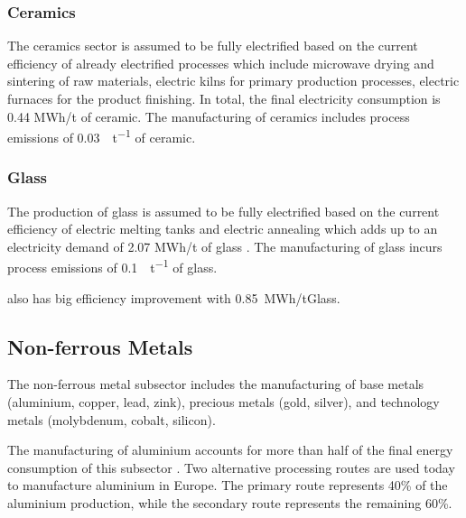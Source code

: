 

\subsubsection{Ceramics}

The ceramics sector is assumed to be fully electrified based on the current
efficiency of already electrified processes which include microwave drying and
sintering of raw materials, electric kilns for primary production processes,
electric furnaces for the product finishing. In total, the final electricity
consumption is 0.44 MWh/t of ceramic. The manufacturing of ceramics includes
process emissions of \SI{0.03}{\tco\per\tonne} of ceramic.


\subsubsection{Glass}

The production of glass is assumed to be fully electrified based on the current
efficiency of electric melting tanks and electric annealing which adds up to an
electricity demand of 2.07 MWh/t of glass
. The manufacturing of glass incurs
process emissions of \SI{0.1}{\tco\per\tonne} of glass.


 also has big efficiency improvement with 0.85~MWh\el/tGlass.

\subsection{Non-ferrous Metals}
\label{sec:si:industry:nfm}

The non-ferrous metal subsector includes the manufacturing of base metals
(aluminium, copper, lead, zink), precious metals (gold, silver), and technology
metals (molybdenum, cobalt, silicon).

The manufacturing of aluminium accounts for more than half of the final energy
consumption of this subsector \citeS{}. Two alternative processing routes are
used today to manufacture aluminium in Europe. The primary route represents 40\%
of the aluminium production, while the secondary route represents the remaining
60\%.

